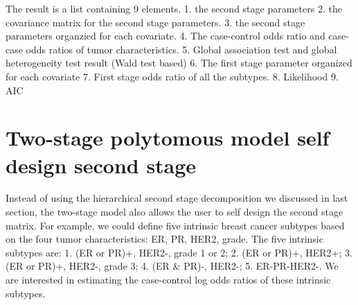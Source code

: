 \documentclass[11pt,]{article}
\begin{document}
The result is a list containing 9 elements. 1. the second stage
parameters 2. the covariance matrix for the second stage parameters. 3.
the second stage parameters organzied for each covariate. 4. The
case-control odds ratio and case-case odds ratios of tumor
characteristics. 5. Global association test and global heterogeneity
test result (Wald test based) 6. The first stage parameter organized for
each covariate 7. First stage odds ratio of all the subtypes. 8.
Likelihood 9. AIC

\section{Two-stage polytomous model self design second
stage}\label{two-stage-polytomous-model-self-design-second-stage}

Instead of using the hierarchical second stage decomposition we
discussed in last section, the two-stage model also allows the user to
self design the second stage matrix. For example, we could define five
intrinsic breast cancer subtypes based on the four tumor
characteristics: ER, PR, HER2, grade. The five intrinsic subtypes are:
1. (ER or PR)+, HER2-, grade 1 or 2; 2. (ER or PR)+, HER2+; 3. (ER or
PR)+, HER2-, grade 3; 4. (ER \& PR)-, HER2-; 5. ER-PR-HER2-. We are
interested in estimating the case-control log odds ratios of these
intrinsic subtypes.
\end{document}
